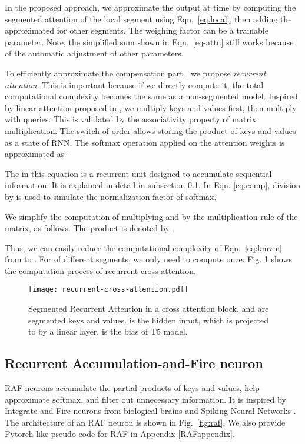 \documentclass[11pt]{article}
\begin{document}
In the proposed approach, we approximate the output at time  by computing the segmented attention  of the local segment using Eqn.~\ref{eq.local}, then adding the approximated  for other segments. The weighing factor  can be a trainable parameter. Note, the simplified sum shown in Eqn.~\ref{eq-attn} still works because of the automatic adjustment of other parameters.


To efficiently approximate the compensation part , we propose \textit{recurrent attention}. This is important because if we directly compute it, the total computational complexity becomes the same as a non-segmented model. Inspired by linear attention proposed in \citet{transformerRNN}, we multiply keys and values first, then multiply with queries. This is validated by the associativity property of matrix multiplication. The switch of order allows storing the product of keys and values as a state of RNN.  The softmax operation applied on the attention weights is approximated as-
 
The  in this equation is a recurrent unit  designed to accumulate sequential information. It is explained in detail in subsection \ref{RAFsection}. In Eqn. \ref{eq.comp}, division by  is used to simulate the normalization factor of softmax. 


We simplify the computation of multiplying  and  by the multiplication rule of the matrix, as follows. The product is denoted by .
 
Thus, we can easily reduce the computational complexity of Eqn.~\ref{eq:kmvm} from  to . For  of different segments, we only need to compute  once. Fig. \ref{fig:cross} shows the computation process of recurrent cross attention.

\begin{figure}
    \centering
    \texttt{[image: recurrent-cross-attention.pdf]}
    \caption{Segmented Recurrent Attention in a cross attention block.  and  are segmented keys and values.  is the hidden input, which is projected to  by a linear layer.  is the bias of T5 model. }
    \label{fig:cross}
\end{figure}
\subsection{Recurrent Accumulation-and-Fire neuron}
\label{RAFsection}
RAF neurons accumulate the partial products of keys and values, help approximate softmax, and filter out unnecessary information. It is inspired by Integrate-and-Fire neurons from biological brains and Spiking Neural Networks \citep{ deepsnn,biosnn, Ponghiran2021SpikingNN, onestep-SNN}. The architecture of an RAF neuron is shown in Fig.~\ref{fig:raf}. We also provide Pytorch-like pseudo code for RAF in Appendix \ref{RAFappendix}.
\end{document}
